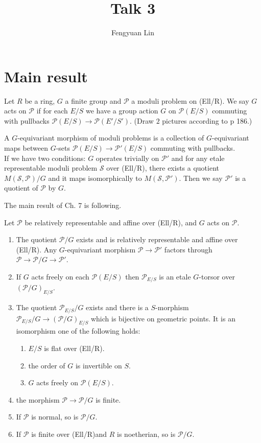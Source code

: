 
\newcommand{\cP}{\mathcal{P}}
\newcommand{\cS}{\mathcal{S}}
\newcommand{\pes}{\cP_{E/S}}
\newcommand{\ellr}{(Ell/R)}
\newcommand{\sch}{\text{Sch}}
\newcommand{\gl}{[\Gamma(l)]}



\title{Talk 3}
\author{Fengyuan Lin}
\maketitle
\section{Main result}
Let $R$ be a ring, $G$ a finite group and $\cP$ a moduli problem on \ellr. We say $G$ acts on $\cP$ if for each $E/S$ we have a group action $G$ on $\cP(E/S)$ commuting with pullbacks $\cP(E/S) \to \cP(E'/S')$. (Draw $2$ pictures according to p 186.) \\
\begin{definition}
	A $G$-equivariant morphism of moduli problems is a collection of $G$-equivariant maps between $G$-sets $\cP(E/S) \to \cP'(E/S)$ commuting with pullbacks. \\
	If we have two conditions: $G$ operates trivially on $\cP'$ and for any etale representable moduli problem $\cS$ over \ellr, there exists a quotient $M(\cS,\cP)/G$ and it maps isomorphically to $M(\cS,\cP')$. Then we say $\cP'$ is a quotient of $\cP$ by $G$.
\end{definition}
The main result of Ch. 7 is following.
\begin{theorem}
	Let $\cP$ be relatively representable and affine over \ellr, and $G$ acts on $\cP$.
	\begin{enumerate}
		\item The quotient $\cP/G$ exists and is relatively representable and affine over \ellr. Any $G$-equivariant morphism $\cP \to \cP'$ factors through $\cP \to \cP/G \to \cP'$.
		\item If $G$ acts freely on each $\cP(E/S)$ then $\cP_{E/S}$ is an etale $G$-torsor over $(\cP/G)_{E/S}$.
		\item The quotient $\cP_{E/S}/G$ exists and there is a $S$-morphism $\pes/G\to (\cP/G)_{E/S}$ which is bijective on geometric points.
		      It is an isomorphism one of the following holds:
		      \begin{enumerate}
			      \item $E/S$ is flat over \ellr.
			      \item the order of $G$ is invertible on $S$.
			      \item $G$ acts freely on $\cP(E/S)$.
		      \end{enumerate}
		\item the morphism $\cP\to\cP/G$ is finite.
		\item If $\cP$ is normal, so is $\cP/G$.
		\item If $\cP$ is finite over \ellr and $R$ is noetherian, so is $\cP/G$.
	\end{enumerate}
\end{theorem}
